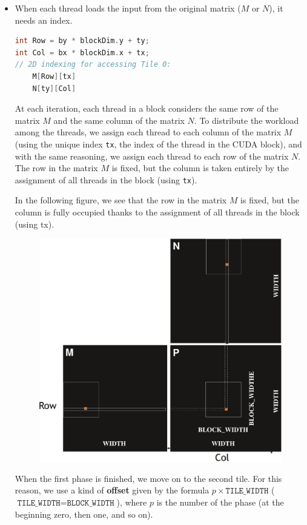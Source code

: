 \begin{itemize}
    \item When each thread loads the input from the original matrix ($M$ or $N$), it needs an index.
    \begin{lstlisting}[language=C++]
int Row = by * blockDim.y + ty;
int Col = bx * blockDim.x + tx;
// 2D indexing for accessing Tile 0:
    M[Row][tx]
    N[ty][Col]\end{lstlisting}
    At each iteration, each thread in a block considers the same row of the matrix $M$ and the same column of the matrix $N$. To distribute the workload among the threads, we assign each thread to each column of the matrix $M$ (using the unique index \texttt{tx}, the index of the thread in the CUDA block), and with the same reasoning, we assign each thread to each row of the matrix $N$. The row in the matrix $M$ is fixed, but the column is taken entirely by the assignment of all threads in the block (using \texttt{tx}).

    In the following figure, we see that the row in the matrix $M$ is fixed, but the column is fully occupied thanks to the assignment of all threads in the block (using tx).
    \begin{figure}[!htp]
        \centering
        \includegraphics[width=.65\textwidth]{img/cuda-implementation-tile-1.pdf}
    \end{figure}
    \newpage
    When the first phase is finished, we move on to the second tile. For this reason, we use a kind of \textbf{offset} given by the formula $p \times \texttt{TILE\_WIDTH}$ ($\texttt{TILE\_WIDTH} = \texttt{BLOCK\_WIDTH}$), where $p$ is the number of the phase (at the beginning zero, then one, and so on).


\end{itemize}
